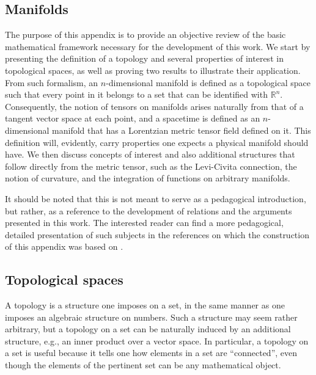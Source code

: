 \documentclass[
12pt,		%
openright,	%
twoside,  %
a4paper,			%
chapter=TITLE,		%
english,			%
french,				%
spanish,			%
brazil				%
]{USPSC-classe/USPSC}
\begin{document}
\begin{apendicesenv}
\partapendices

\chapter{Manifolds}\label{A}

The purpose of this appendix is to provide an objective review of the basic mathematical framework necessary for the development of this work. We start by presenting the definition of a topology and several properties of interest in topological spaces, as well as proving two results to illustrate their application. From such formalism, an $n$-dimensional manifold is defined as a topological space such that every point in it belongs to a set that can be identified with $\mathbb{R}^n$. Consequently, the notion of tensors on manifolds arises naturally from that of a tangent vector space at each point, and a spacetime is defined as an $n$-dimensional manifold that has a Lorentzian metric tensor field defined on it. This definition will, evidently, carry properties one expects a physical manifold should have. We then discuss concepts of interest and also additional structures that follow directly from the metric tensor, such as the Levi-Civita connection, the notion of curvature, and the integration of functions on arbitrary manifolds. 

It should be noted that this is not meant to serve as a pedagogical introduction, but rather, as a reference to the development of relations and the arguments presented in this work. The interested reader can find a more pedagogical, detailed presentation of such subjects in the references on which the construction of this appendix was based on \cite{Wald1984, Misner1973, Poisson2004, Hawking1973, Darling1994, ONeill1983, Evans, Lee2003,Lee2011}.

\section{Topological spaces}\label{A1}

A topology is a structure one imposes on a set, in the same manner as one imposes an algebraic structure on numbers. Such a structure may seem rather arbitrary, but a topology on a set can be naturally induced by an additional structure, e.g., an inner product over a vector space. In particular, a topology on a set is useful because it tells one how elements in a set are ``connected'', even though the elements of the pertinent set can be any mathematical object. 


\end{apendicesenv}
\end{document}

